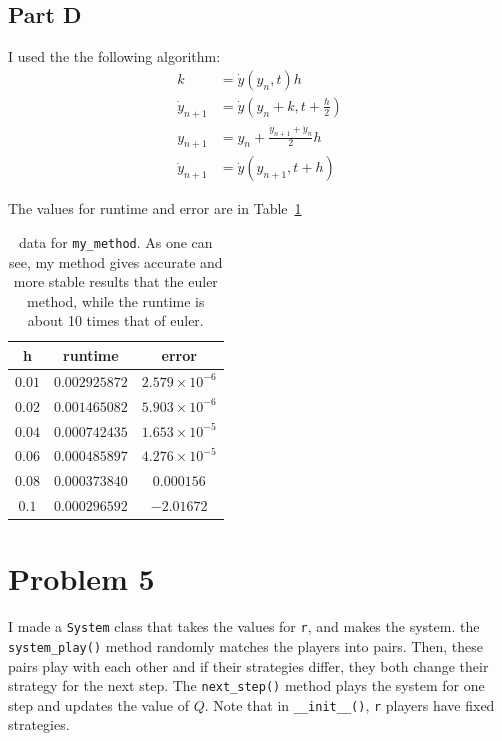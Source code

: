 \documentclass[12pt, a4paper]{article}
\begin{document}
	\subsection{Part D}
	I used the the following algorithm:
	\begin{equation}
		\begin{aligned}
			k &= \dot{y}(y_n, t) h\\
			\dot{y}_{n+1} &= \dot{y}(y_n + k, t + \frac{h}{2}) \\
			y_{n+1} &= y_n + \frac{\dot{y}_{n + 1} + \dot{y}_n}{2}  h\\
			\dot{y}_{n+1} &= \dot{y}(y_{n+1}, t + h) 
		\end{aligned}
	\end{equation}

	The values for runtime and error are in Table~\ref{tab:my_method}
	
		\begin{table}[h!]
		\centering
		\begin{tabular}{|c|c|c|}
			\hline
			h & runtime & error \\
			\hline
			$0.01$ & $0.002925872$ & $2.579 \times 10 ^{-6}$ \\
			\hline
			$0.02$ & $0.001465082$ & $5.903 \times 10 ^{-6}$ \\
			\hline
			$0.04$ & $0.000742435$ & $1.653 \times 10 ^{-5}$ \\
			\hline
			$0.06$ & $0.000485897$ & $4.276 \times 10 ^{-5}$  \\
			\hline
			$0.08$ &$0.000373840$ & $0.000156$  \\
			\hline
			$0.1$ &$0.000296592$  & $-2.01672$  \\
			\hline
		\end{tabular}
		\caption{data for \texttt{my\_method}. As one can see, my method gives accurate and more stable results that the euler method, while the 
			runtime is about 10 times that of euler.}
		\label{tab:my_method}
	\end{table}

	\section{Problem 5}
	I made a \texttt{System} class that takes the values for \texttt{r}, and makes the system. the \texttt{system\_play()} method randomly 
	matches the players into pairs. Then, these pairs play with each other and if their strategies differ, they both change their strategy for the next
	step. The \texttt{next\_step()} method plays the system for one step and updates the value of $Q$. Note that in \texttt{\_\_init\_\_()}, 
	\texttt{r} players have fixed strategies.
\end{document}
